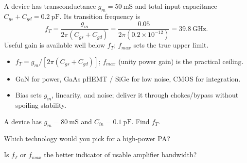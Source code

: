 \begin{workedexample}
A device has transconductance $g_m = 50\ \text{mS}$ and total input
capacitance $C_{gs}+C_{gd} = 0.2\ \text{pF}$. Its transition frequency is
\[ f_T = \frac{g_m}{2\pi(C_{gs}+C_{gd})} = \frac{0.05}{2\pi(0.2\times10^{-12})} = 39.8\ \text{GHz}. \]
Useful gain is available well below $f_T$; $f_{max}$ sets the true upper limit.
\end{workedexample}

\begin{keytakeaways}
\begin{itemize}[leftmargin=1.4em,itemsep=2pt]
\item $f_T = g_m/[2\pi(C_{gs}+C_{gd})]$; $f_{max}$ (unity power gain) is the practical ceiling.
\item GaN for power, GaAs pHEMT / SiGe for low noise, CMOS for integration.
\item Bias sets $g_m$, linearity, and noise; deliver it through chokes/bypass without spoiling stability.
\end{itemize}
\end{keytakeaways}

\begin{exercises}
\item A device has $g_m = 80\ \text{mS}$ and $C_{in} = 0.1\ \text{pF}$. Find $f_T$.
\item Which technology would you pick for a high-power PA?
\item Is $f_T$ or $f_{max}$ the better indicator of usable amplifier bandwidth?
\end{exercises}

